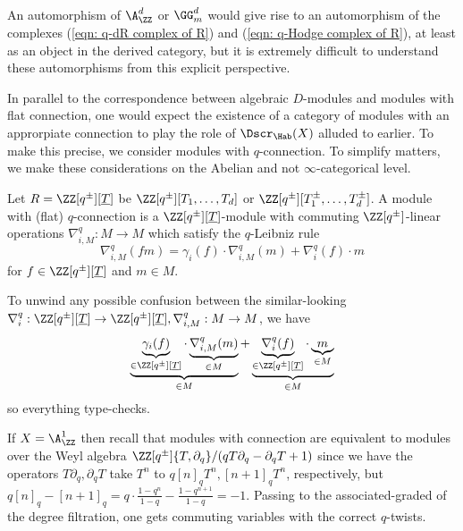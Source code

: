 \begin{remark}
    An automorphism of $\A^{d}_{\ZZ}$ or $\GG_{m}^{d}$ would give rise to an automorphism of the complexes (\ref{eqn: q-dR complex of R}) and (\ref{eqn: q-Hodge complex of R}), at least as an object in the derived category, but it is extremely difficult to understand these automorphisms from this explicit perspective. 
\end{remark}
In parallel to the correspondence between algebraic $D$-modules and modules with flat connection, one would expect the existence of a category of modules with an approrpiate connection to play the role of $\Dscr_{\Hab}(X)$ alluded to earlier. To make this precise, we consider modules with $q$-connection. To simplify matters, we make these considerations on the Abelian and not $\infty$-categorical level. 
\begin{definition}\label{def: q-connections on modules}
    Let $R=\ZZ[q^{\pm}][\underline{T}]$ be $\ZZ[q^{\pm}][T_{1},\dots,T_{d}]$ or $\ZZ[q^{\pm}][T_{1}^{\pm},\dots,T_{d}^{\pm}]$. A module with (flat) $q$-connection is a $\ZZ[q^{\pm}][\underline{T}]$-module with commuting $\ZZ[q^{\pm}]$-linear operations $\nabla_{i,M}^{q}:M\to M$ which satisfy the $q$-Leibniz rule 
    $$\nabla_{i,M}^{q}(fm)=\gamma_{i}(f)\cdot\nabla_{i,M}^{q}(m)+\nabla_{i}^{q}(f)\cdot m$$
    for $f\in \ZZ[q^{\pm}][\underline{T}]$ and $m\in M$.
\end{definition}
\begin{remark}
    To unwind any possible confusion between the similar-looking $\nabla_{i}^{q}:\ZZ[q^{\pm}][\underline{T}]\to\ZZ[q^{\pm}][\underline{T}],\nabla_{i,M}^{q}:M\to M$, we have 
    $$\underbrace{\underbrace{\gamma_{i}(f)}_{\in \ZZ[q^{\pm}][\underline{T}]}\cdot\underbrace{\nabla_{i,M}^{q}(m)}_{\in M}}_{\in M}+\underbrace{\underbrace{\nabla_{i}^{q}(f)}_{\in \ZZ[q^{\pm}][\underline{T}]}\cdot\underbrace{m}_{\in M}}_{\in M}$$
    so everything type-checks. 
\end{remark}
\begin{example}\label{ex: A1 with Weyl algebra}
    If $X=\A^{1}_{\ZZ}$ then recall that modules with connection are equivalent to modules over the Weyl algebra $\ZZ[q^{\pm}]\{T,\partial_{q}\}/(qT\partial_{q}-\partial_{q}T+1)$ since we have the operators $T\partial_{q},\partial_{q}T$ take $T^{n}$ to $q[n]_{q}T^{n},[n+1]_{q}T^{n}$, respectively, but $q[n]_{q}-[n+1]_{q}=q\cdot\frac{1-q^{n}}{1-q}-\frac{1-q^{n+1}}{1-q}=-1$. Passing to the associated-graded of the degree filtration, one gets commuting variables with the correct $q$-twists. 
\end{example}
